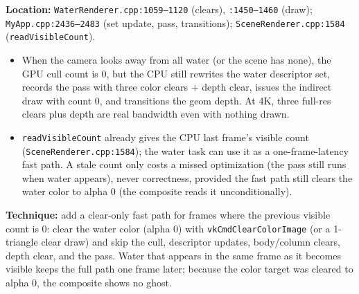 \documentclass[11pt,a4paper]{article}
\begin{document}
\textbf{Location:} \texttt{WaterRenderer.cpp:1059--1120} (clears), \texttt{:1450--1460} (draw); \texttt{MyApp.cpp:2436--2483} (set update, pass, transitions);
\texttt{SceneRenderer.cpp:1584} (\texttt{readVisibleCount}).

\begin{itemize}
    \item When the camera looks away from all water (or the scene has none), the GPU cull count is 0, but the CPU still rewrites the water descriptor set, records the pass with
    three color clears $+$ depth clear, issues the indirect draw with count 0, and transitions the geom depth. At 4K, three full-res clears plus depth are real bandwidth even
    with nothing drawn.
    \item \texttt{readVisibleCount} already gives the CPU last frame's visible count (\texttt{SceneRenderer.cpp:1584}); the water task can use it as a one-frame-latency fast
    path. A stale count only costs a missed optimization (the pass still runs when water appears), never correctness, provided the fast path still clears the water color to
    alpha 0 (the composite reads it unconditionally).
\end{itemize}

\textbf{Technique:} add a clear-only fast path for frames where the previous visible count is 0: clear the water color (alpha 0) with \texttt{vkCmdClearColorImage} (or a 1-triangle
clear draw) and skip the cull, descriptor updates, body/column clears, depth clear, and the pass. Water that appears in the same frame as it becomes visible keeps the full path
one frame later; because the color target was cleared to alpha 0, the composite shows no ghost.
\end{document}
